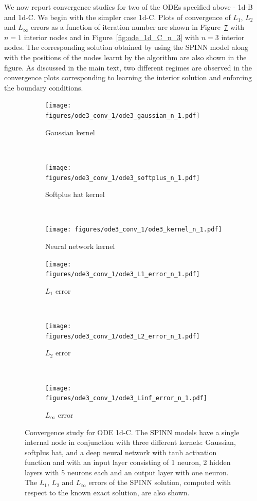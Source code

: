 \documentclass[12pt]{article}
\begin{document}
We now report convergence studies for two of the ODEs specified above - 1d-B and 1d-C. We begin with the simpler case 1d-C. Plots of convergence of $L_1$, $L_2$ and $L_{\infty}$ errors as a function of iteration number are shown in Figure~\ref{fig:ode_1d_C_n_1} with $n=1$ interior nodes and in Figure~\ref{fig:ode_1d_C_n_3} with $n=3$ interior nodes. The corresponding solution obtained by using the SPINN model along with the positions of the nodes learnt by the algorithm are also shown in the figure. As discussed in the main text, two different regimes are observed in the convergence plots corresponding to learning the interior solution and enforcing the boundary conditions.

\begin{figure}
\begin{subfigure}{0.32\textwidth}
\centering
\texttt{[image: figures/ode3\_conv\_1/ode3\_gaussian\_n\_1.pdf]}
\caption{Gaussian kernel}
\label{fig:ode3_gaussian_n_1}
\end{subfigure}
~
\begin{subfigure}{0.32\textwidth}
\centering
\texttt{[image: figures/ode3\_conv\_1/ode3\_softplus\_n\_1.pdf]}
\caption{Softplus hat kernel}
\label{fig:ode3_softplus_n_1}    
\end{subfigure}
~
\begin{subfigure}{0.32\textwidth}
\centering
\texttt{[image: figures/ode3\_conv\_1/ode3\_kernel\_n\_1.pdf]}
\caption{Neural network kernel}
\label{fig:ode3_kernel_n_1}    
\end{subfigure}
\begin{subfigure}{0.32\textwidth}
\centering
\texttt{[image: figures/ode3\_conv\_1/ode3\_L1\_error\_n\_1.pdf]}
\caption{$L_1$ error}
\label{fig:ode3_L1_n_1}  
\end{subfigure}
~
\begin{subfigure}{0.32\textwidth}
\centering
\texttt{[image: figures/ode3\_conv\_1/ode3\_L2\_error\_n\_1.pdf]}
\caption{$L_2$ error}
\label{fig:ode3_L2_n_1}      
\end{subfigure}
~
\begin{subfigure}{0.32\textwidth}
\centering
\texttt{[image: figures/ode3\_conv\_1/ode3\_Linf\_error\_n\_1.pdf]}
\caption{$L_{\infty}$ error}
\label{fig:ode3_Linf_n_1}      
\end{subfigure}
\caption{Convergence study for ODE 1d-C. The SPINN models have a single internal node in conjunction with three different kernels: Gaussian, softplus hat, and a deep neural network with tanh activation function and with an input layer consisting of 1 neuron, 2 hidden layers with 5 neurons each and an output layer with one neuron. The $L_1$, $L_2$ and $L_{\infty}$ errors of the SPINN solution, computed with respect to the known exact solution, are also shown.}
\label{fig:ode_1d_C_n_1}
\end{figure}
\end{document}
